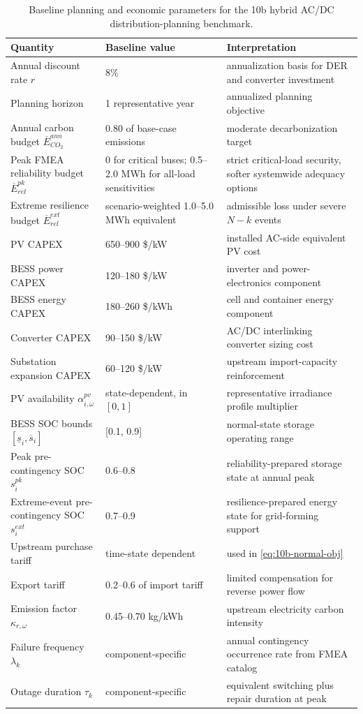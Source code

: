 \begin{table}[t]
\centering
\caption{Baseline planning and economic parameters for the 10b hybrid AC/DC distribution-planning benchmark.}
\label{tab:10b-parameter-baseline-a}
\begin{tabular}{L{0.34\textwidth}L{0.22\textwidth}L{0.34\textwidth}}
\toprule
Quantity & Baseline value & Interpretation \\
\midrule
Annual discount rate \(r\) & 8\% & annualization basis for DER and converter investment \\
Planning horizon & 1 representative year & annualized planning objective \\
Annual carbon budget \(\overline E^{ann}_{CO_2}\) & 0.80 of base-case emissions & moderate decarbonization target \\
Peak FMEA reliability budget \(\overline E^{pk}_{rel}\) & 0 for critical buses; 0.5--2.0 MWh for all-load sensitivities & strict critical-load security, softer systemwide adequacy options \\
Extreme resilience budget \(\overline E^{ext}_{rel}\) & scenario-weighted 1.0--5.0 MWh equivalent & admissible loss under severe \(N{-}k\) events \\
PV CAPEX & 650--900 \$/kW & installed AC-side equivalent PV cost \\
BESS power CAPEX & 120--180 \$/kW & inverter and power-electronics component \\
BESS energy CAPEX & 180--260 \$/kWh & cell and container energy component \\
Converter CAPEX & 90--150 \$/kW & AC/DC interlinking converter sizing cost \\
Substation expansion CAPEX & 60--120 \$/kW & upstream import-capacity reinforcement \\
PV availability \(\alpha^{pv}_{i,\omega}\) & state-dependent, in \([0,1]\) & representative irradiance profile multiplier \\
BESS SOC bounds \([\underline s_i,\overline s_i]\) & [0.1, 0.9] & normal-state storage operating range \\
Peak pre-contingency SOC \(s_i^{pk}\) & 0.6--0.8 & reliability-prepared storage state at annual peak \\
Extreme-event pre-contingency SOC \(s_i^{ext}\) & 0.7--0.9 & resilience-prepared energy state for grid-forming support \\
Upstream purchase tariff & time-state dependent & used in \eqref{eq:10b-normal-obj} \\
Export tariff & 0.2--0.6 of import tariff & limited compensation for reverse power flow \\
Emission factor \(\kappa_{r,\omega}\) & 0.45--0.70 kg/kWh & upstream electricity carbon intensity \\
Failure frequency \(\lambda_k\) & component-specific & annual contingency occurrence rate from FMEA catalog \\
Outage duration \(\tau_k\) & component-specific & equivalent switching plus repair duration at peak \\
\bottomrule
\end{tabular}
\end{table}

